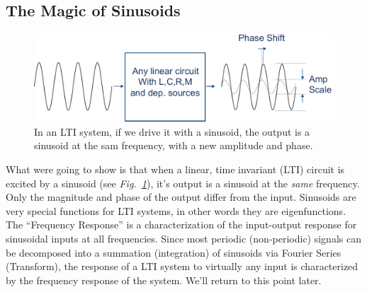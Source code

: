 \subsection{The Magic of Sinusoids}
\begin{figure}[tb]
\centering
\includegraphics[width=.75\columnwidth]{lti_sine}
\caption{In an LTI system, if we drive it with a sinusoid, the output is a sinusoid at the sam frequency, with a new amplitude and phase. }
\label{fig:lti_sine}
\end{figure}
What were going to show is that when a linear, time invariant (LTI) circuit is excited by a sinusoid (see \emph{Fig.~\ref{fig:lti_sine}}), it's output is a sinusoid at the \emph{same} frequency.  Only the magnitude and phase of the output differ from the input.  Sinusoids are very special functions for LTI systems, in other words they are eigenfunctions.  The ``Frequency Response'' is a characterization of the input-output response for sinusoidal inputs at all frequencies.
Since most periodic (non-periodic) signals can be decomposed into a summation (integration) of sinusoids via Fourier Series (Transform), the response of a LTI system to virtually any input is characterized by the frequency response of the system.  We'll return to this point later.
